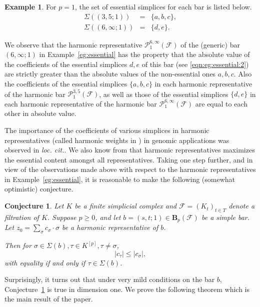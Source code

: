 \documentclass[11pt]{amsart}
\theoremstyle{theorem}
\newtheorem{conjecture}{Conjecture}[section]
\theoremstyle{remark}
\theoremstyle{definition}
\newtheorem{example}{Example}[section]
\newcommand{\hide}[1]{}
\newcommand{\FF}{\mathcal{F}}
\begin{document}
\begin{example}
For $p = 1$, the set of essential  simplices for each bar is listed below.
\begin{eqnarray}
\label{eqn:eg:essential:1}
\Sigma((3,5;1)) &=& \{a,b,c\}, \\
\label{eqn:eg:essential:2}
\Sigma((6,\infty;1)) &=& \{d,e\}.
\end{eqnarray}

\end{example}

We observe that the harmonic representative 
$\mathcal{P}_1^{6,\infty}(\FF)$
of the (generic) bar $(6,\infty;1)$ in Example~\ref{eg:essential} has the property that the absolute value of the coefficients of the essential simplices
$d,e$ of this bar (see \eqref{eqn:eg:essential:2})
are strictly greater than the absolute values of the non-essential ones 
$a,b,c$.
Also the coefficients of the essential simplices $\{a,b,c\}$ in each harmonic representative of the harmonic bar $\mathcal{P}_1^{3,5}(\mathcal{F})$, as well as
those of the essential simplices $\{d,e\}$ 
in each harmonic representative of the harmonic bar $\mathcal{P}_1^{6,\infty}(\FF)$
are equal to each other in absolute value.
 
The importance of the coefficients of various simplices in harmonic representatives (called harmonic weights in \cite{Gurnari-et-al}) in  genomic applications was observed in \emph{loc. cit.}.
We also know from \cite{Basu-Cox} that harmonic representatives maximizes the essential content amongst all  representatives. Taking one step further, 
and in view of the observations made above with respect to the harmonic representatives in Example~\ref{eg:essential},
it is reasonable to make the following (somewhat optimistic) conjecture.

\begin{conjecture}
\label{conj:essential}
Let $K$ be a finite simplicial complex and $\mathcal{F} = (K_t)_{t \in T}$ denote a filtration
of $K$. Suppose $p \geq 0$, and  
let $b = (s,t;1) \in \mathbf{B}_p(\mathcal{F})$ be a simple bar.
Let $z_0 = \sum_{\sigma} c_\sigma\cdot \sigma$
be a harmonic representative of $b$. 
\hide{
Then for $\sigma \in \Sigma(b), \tau \in K^{[p]}\setminus\Sigma(b)$,
\[
|c_\tau| < |c_\sigma|.
\]
}
Then for $\sigma \in \Sigma(b), \tau \in K^{[p]}, \tau \neq \sigma$,
\[
|c_\tau| \leq  |c_\sigma|,
\]
with equality if and only if $\tau \in \Sigma(b)$.
\end{conjecture}

Surprisingly, it turns out that under very mild conditions on the bar $b$, Conjecture~\ref{conj:essential} is true in dimension one.
We prove the following theorem which is the main result of the paper.
\end{document}
